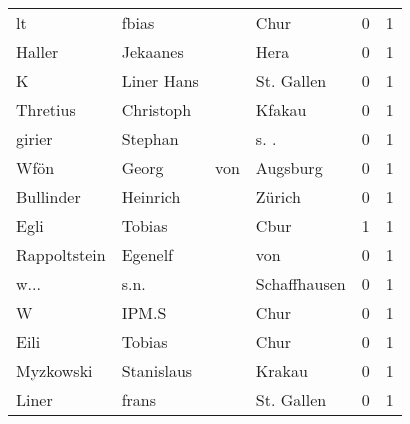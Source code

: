 \begin{tabular}{llllrr}
                       lt &                              fbias &             &                                        Chur &          0 &         1 \\
                   Haller &                           Jekaanes &             &                                        Hera &          0 &         1 \\
                        K &                         Liner Hans &             &                                  St. Gallen &          0 &         1 \\
                 Thretius &                          Christoph &             &                                      Kfakau &          0 &         1 \\
                   girier &                            Stephan &             &                                       s. .  &          0 &         1 \\
                     Wfön &                              Georg &         von &                                    Augsburg &          0 &         1 \\
                Bullinder &                           Heinrich &             &                                      Zürich &          0 &         1 \\
                     Egli &                             Tobias &             &                                        Cbur &          1 &         1 \\
             Rappoltstein &                            Egenelf &             &                                         von &          0 &         1 \\
                     w... &                               s.n. &             &                                Schaffhausen &          0 &         1 \\
                        W &                              IPM.S &             &                                        Chur &          0 &         1 \\
                     Eili &                             Tobias &             &                                        Chur &          0 &         1 \\
                Myzkowski &                         Stanislaus &             &                                      Krakau &          0 &         1 \\
                    Liner &                              frans &             &                                  St. Gallen &          0 &         1 \\

\end{tabular}
